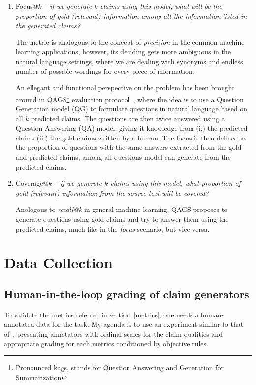 \begin{enumerate}
    \item {\techbf Focus}$@k$ -- \textit{if we generate $k$ claims using this model, what will be the proportion of gold (relevant) information among all the information listed in the generated claims?}
    
    The metric is analogous to the concept of \textit{precision} in the common machine learning applications, however, its deciding gets more ambiguous in the natural language settings, where we are dealing with synonyms and endless number of possible wordings for every piece of information.

    An ellegant and functional perspective on the problem has been brought around in QAGS\footnote{Pronounced \"{kags}, stands for \"{Question Answering and Generation for Summarization}} evaluation protocol~\cite{wang-etal-2020-asking}, where the idea is to use a Question Generation model (QG) to formulate questions in natural language based on all $k$ predicted claims. The questions are then twice answered using a Question Answering (QA) model, giving it knowledge from (i.) the predicted claims (ii.) the gold claims written by a human.
    The focus is then defined as the proportion of questions with the same answers extracted from the gold and predicted claims, among all questions model can generate from the predicted claims. 

    \item {\techbf Coverage}$@k$ -- \textit{if we generate $k$ claims using this model, what proportion of gold (relevant) information from the source text will be covered?}
    
    Anologous to \textit{recall@k} in general machine learning, QAGS proposes to generate questions using gold claims and try to answer them using the predicted claims, much like in the \textit{focus} scenario, but vice versa.
\end{enumerate}

\section{Data Collection}
\subsection{Human-in-the-loop grading of claim generators}
To validate the metrics referred in section~\ref{metrics}, one needs a human-annotated data for the task.
My agenda is to use an experiment similar to that of~\cite{wright}, presenting annotators with ordinal scales for the claim qualities and appropriate grading for each metrics conditioned by objective rules.

